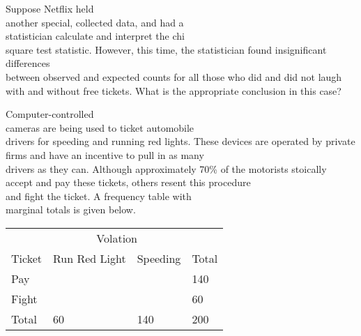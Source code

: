 \documentclass[11pt]{book}\usepackage[]{graphicx}\usepackage[]{color}
\begin{document}
\begin{exercises}
\begin{solution}
\end{solution}

\begin{exercise} %

Suppose Netflix held \\ another special, collected data, and had a \\ statistician calculate and interpret the chi \\ square test statistic. However, this time, the statistician found insignificant differences \\ between observed and expected counts for all those who did and did not laugh with and without free tickets. What is the appropriate conclusion in this case?
\end{exercise}
\begin{solution} %

\end{solution}

\begin{exercise} %

Computer-controlled \\ cameras are being used to ticket automobile \\ drivers for speeding and running red lights.  These devices are operated by private firms and have an incentive to pull in as many \\ drivers as they can.  Although approximately 70\% of the motorists stoically accept and pay these tickets, others resent this procedure \\ and fight the ticket.  A frequency table with \\ marginal totals is given below. 

\begin{table}[ht]
\centering
\begin{tabular}{@{} llll @{}} \hline
& \multicolumn{2}{c}{Volation} \\
Ticket & Run Red Light & Speeding & Total \\ \hline
Pay  &  &   & 140 \\
Fight   &  &  & 60  \\ \hline
Total & 60 & 140 & 200 \\ \hline
\end{tabular}
\end{table}


\end{exercise}
\end{exercises}
\end{document}
